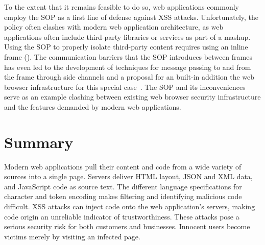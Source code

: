 To the extent that it remains feasible to do so, web applications commonly employ the SOP as a first line of defense against XSS attacks.
Unfortunately, the policy often clashes with modern web application architecture, as web applications often include third-party libraries or services as part of a mashup.
Using the SOP to properly isolate third-party content requires using an inline frame ().
The communication barriers that the SOP introduces between frames has even led to the development of techniques for message passing to and from the frame through side channels and a proposal for an built-in addition the web browser infrastructure for this special case~\cite{barth.etal+08, barth.etal+09}.
The SOP and its inconveniences serve as an example clashing between existing web browser security infrastructure and the features demanded by modern web applications.

\section{Summary}

Modern web applications pull their content and code from a wide variety of sources into a single page.
Servers deliver HTML layout, JSON and XML data, and JavaScript code as source text.
The different language specifications for character and token encoding makes filtering and identifying malicious code difficult.
XSS attacks can inject code onto the web application's servers, making code origin an unreliable indicator of trustworthiness.
These attacks pose a serious security risk for both customers and businesses.
Innocent users become victims merely by visiting an infected page.

